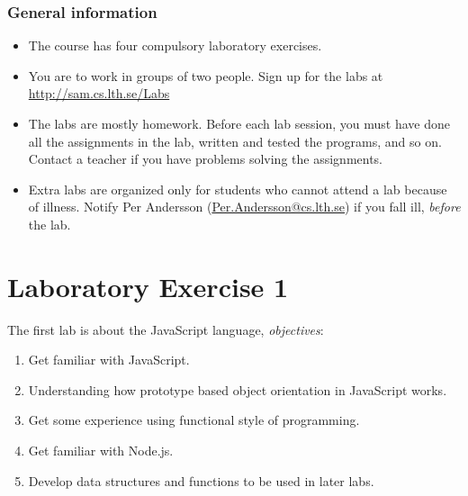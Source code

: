 \documentclass[fleqn, article, a4paper]{memoir}
\begin{document}
\maketitle
\thispagestyle{titlepage}
\vspace{-4cm}

\subsubsection*{General information}

\begin{itemize}\firmlist
\item The course has four compulsory laboratory exercises. 
\item You are to work in groups of two people. Sign up for the labs at\\ \url{http://sam.cs.lth.se/Labs}
\item The labs are mostly homework. Before each lab session, you must have done all the assign\-ments in the lab, written and tested the programs, and so on. Contact a teacher if you have problems solving the assignments. 
\item Extra labs are organized only for students who cannot attend a lab because of illness. Notify Per Andersson (\url{Per.Andersson@cs.lth.se}) if you fall ill, \emph{before} the lab.
\end{itemize}

\section*{Laboratory Exercise 1}
\n The first lab is about the JavaScript language, \emph{objectives}:

\begin{enumerate}\firmlist 
\item Get familiar with JavaScript.
\item Understanding how prototype based object orientation in JavaScript works.
\item Get some experience using functional style of programming.
\item Get familiar with Node.js.
\item Develop data structures and functions to be used in later labs.
\end{enumerate}
\end{document}
